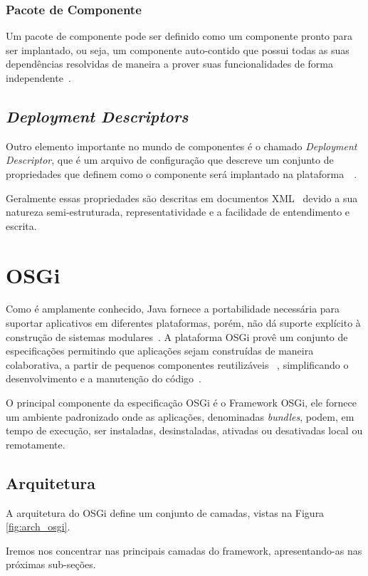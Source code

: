 \subsubsection{Pacote de Componente}
Um pacote de componente pode ser definido como um componente pronto para ser implantado, ou seja, um componente auto-contido que possui todas as suas dependências resolvidas de maneira a prover suas funcionalidades de forma independente~\cite{cervantes2005technical}.

\subsection{\textit{Deployment Descriptors}}
Outro elemento importante no mundo de componentes é o chamado \textit{Deployment Descriptor}, que é um arquivo de configuração que descreve um conjunto de propriedades que definem como o componente será implantado na plataforma~\cite{deploy}~\cite{deployoasis}. 

Geralmente essas propriedades são descritas em documentos XML~\cite{xml} devido a sua natureza semi-estruturada, representatividade e a facilidade de entendimento e escrita. 
\section{OSGi}
\label{sec:osgi}

Como é amplamente conhecido, Java fornece a portabilidade necessária para suportar aplicativos em diferentes plataformas, porém, não dá suporte explícito à construção de sistemas modulares~\cite{hall2010osgi}. A plataforma OSGi provê um conjunto de especificações permitindo que aplicações sejam construídas de maneira colaborativa, a partir de pequenos componentes reutilizáveis ~\cite{osgiorg}, simplificando o desenvolvimento e a manutenção do código~\cite{hall2010osgi}.

O principal componente da especificação OSGi é o Framework OSGi, ele fornece um ambiente padronizado onde as aplicações, denominadas \textit{bundles}, podem, em tempo de execução,  ser instaladas, desinstaladas, ativadas ou desativadas local ou remotamente.


\subsection{Arquitetura}

A arquitetura do OSGi define um conjunto de camadas, vistas na Figura \ref{fig:arch_osgi}. 

Iremos nos concentrar nas principais camadas do framework, apresentando-as nas próximas sub-seções.

